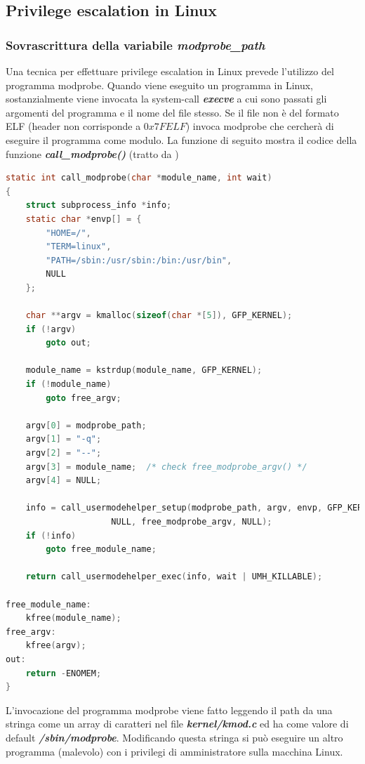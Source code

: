 \documentclass{article}
\begin{document}
\subsection{Privilege escalation in Linux}\label{s:pe-linux}
\subsubsection{Sovrascrittura della variabile \textit{modprobe\_path}}
Una tecnica per effettuare privilege escalation in Linux prevede l'utilizzo del programma 
modprobe. Quando viene eseguito un programma in Linux, sostanzialmente viene invocata 
la system-call \textbf{\textit{execve}} a cui sono passati gli argomenti del programma 
e il nome del file stesso. Se il file non è del formato ELF (header non corrisponde a $0x7FELF$) 
invoca modprobe che cercherà di eseguire il programma come modulo. La funzione di seguito 
mostra il codice della funzione \textbf{\textit{call\_modprobe()}} (tratto da \cite{LinuxDocs})

\begin{lstlisting}[language=C,style=CStyle,caption="Invocazione del programma modprobe per la gestione dei programmi dal formato sconosciuto"]
static int call_modprobe(char *module_name, int wait)
{
	struct subprocess_info *info;
	static char *envp[] = {
		"HOME=/",
		"TERM=linux",
		"PATH=/sbin:/usr/sbin:/bin:/usr/bin",
		NULL
	};

	char **argv = kmalloc(sizeof(char *[5]), GFP_KERNEL);
	if (!argv)
		goto out;

	module_name = kstrdup(module_name, GFP_KERNEL);
	if (!module_name)
		goto free_argv;

	argv[0] = modprobe_path;
	argv[1] = "-q";
	argv[2] = "--";
	argv[3] = module_name;	/* check free_modprobe_argv() */
	argv[4] = NULL;

	info = call_usermodehelper_setup(modprobe_path, argv, envp, GFP_KERNEL,
					 NULL, free_modprobe_argv, NULL);
	if (!info)
		goto free_module_name;

	return call_usermodehelper_exec(info, wait | UMH_KILLABLE);

free_module_name:
	kfree(module_name);
free_argv:
	kfree(argv);
out:
	return -ENOMEM;
} 
\end{lstlisting}

L'invocazione del programma modprobe viene fatto leggendo il path da una stringa 
come un array di caratteri nel file \textbf{\textit{kernel/kmod.c}} ed ha come valore di 
default \textbf{\textit{/sbin/modprobe}}. Modificando questa stringa si può eseguire un 
altro programma (malevolo) con i privilegi di amministratore sulla macchina Linux. 
\end{document}
